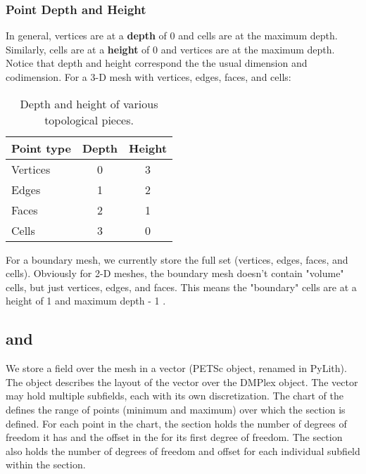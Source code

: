 \subsubsection{Point Depth and Height}

In general, vertices are at a {\bf depth} of 0 and cells are at the maximum depth. Similarly, cells are at a {\bf
height} of 0 and vertices are at the maximum depth. Notice that depth and height correspond the the usual dimension and
codimension. For a 3-D mesh with vertices, edges, faces, and cells:

\begin{table}
\begin{center}
\begin{tabular}{lcc}
\hline
Point type & Depth & Height \\
\hline
Vertices  &  0  &  3 \\
Edges  &  1  &  2 \\
Faces  &  2  &  1 \\
Cells  &  3  &  0 \\
\hline
\end{tabular}
\end{center}
\caption{Depth and height of various topological pieces.}
\end{table}

For a boundary mesh, we currently store the full set (vertices, edges, faces, and cells). Obviously for 2-D meshes, the
boundary mesh doesn't contain "volume" cells, but just vertices, edges, and faces. This means the "boundary" cells are
at a height of 1 and maximum depth - 1 .


\subsection{ and }

We store a field over the mesh in a vector (PETSc  object,
renamed  in PyLith). The  object
describes the layout of the vector over the DMPlex object. The vector
may hold multiple subfields, each with its own discretization. The
chart of the  defines the range of points
(minimum and maximum) over which the section is defined. For each
point in the chart, the section holds the number of degrees of freedom
it has and the offset in the  for its first degree of
freedom. The section also holds the number of degrees of freedom and
offset for each individual subfield within the section.

